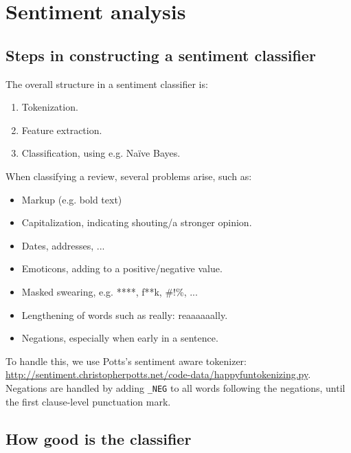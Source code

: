 \section{Sentiment analysis}

\subsection{Steps in constructing a sentiment classifier}
The overall structure in a sentiment classifier is:
\begin{enumerate}
    \item Tokenization.
    \item Feature extraction.
    \item Classification, using e.g. Naïve Bayes.
\end{enumerate}
%
When classifying a review, several problems arise, such as:
\begin{itemize}
    \item Markup (e.g. bold text)
    \item Capitalization, indicating shouting/a stronger opinion.
    \item Dates, addresses, ...
    \item Emoticons, adding to a positive/negative value.
    \item Masked swearing, e.g. ****, f**k, \@\#!\%, ...
    \item Lengthening of words such as really: reaaaaaally.
    \item Negations, especially when early in a sentence.
\end{itemize}

To handle this, we use Potts's sentiment aware tokenizer: \url{http://sentiment.christopherpotts.net/code-data/happyfuntokenizing.py}. Negations are handled by adding \texttt{\_NEG} to all words following the negations, until the first clause-level punctuation mark.





\subsection{How good is the classifier}